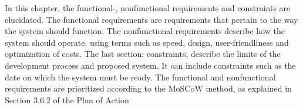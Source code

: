 In this chapter, the functional-, nonfunctional requirements and constraints are elucidated. The functional requirements are requirements that pertain to the way the system should function. The nonfunctional requirements describe how the system should operate, using terms such as speed, design, user-friendliness and optimization of costs. The last section: constraints, describe the limits of the development process and proposed system. It can include constraints such as the date on which the system must be ready. The functional and nonfunctional requirements are prioritized according to the MoSCoW method, as explained in Section 3.6.2 of the Plan of Action